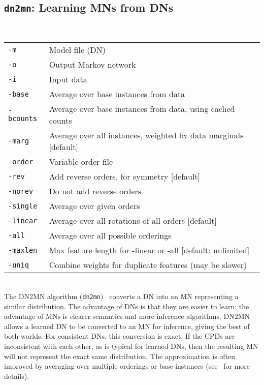 \documentclass[11pt]{article}
\begin{document}
\subsection{{\tt dn2mn}: Learning MNs from DNs} \label{sec:dn2mn}

\noindent {} \\
\begin{tabular}{ll}
{\tt -m} &        Model file (DN) \\
{\tt -o} &        Output Markov network \\
{\tt -i} &        Input data \\
{\tt -base} &     Average over base instances from data \\
{\tt -bcounts} &  Average over base instances from data, using cached counts \\
{\tt -marg} &     Average over all instances, weighted by data marginals [default] \\
{\tt -order} &    Variable order file \\
{\tt -rev} &      Add reverse orders, for symmetry [default] \\
{\tt -norev} &    Do not add reverse orders \\
{\tt -single} &   Average over given orders \\
{\tt -linear} &   Average over all rotations of all orders [default] \\
{\tt -all} &      Average over all possible orderings \\
{\tt -maxlen} &   Max feature length for -linear or -all [default: unlimited] \\
{\tt -uniq} &     Combine weights for duplicate features (may be slower) \\
\end{tabular} \\

The DN2MN algorithm ({\tt dn2mn})~\cite{lowd12} converts a DN into an
MN representing a similar distribution.  The advantage of DNs is that
they are easier to learn; the advantage of MNs is clearer semantics
and more inference algorithms.  DN2MN allows a learned DN to be
converted to an MN for inference, giving the best of both worlds.  For
consistent DNs, this conversion is exact.  If the CPDs are
inconsistent with each other, as is typical for learned DNs, then the
resulting MN will not represent the exact same distribution.  The
approximation is often improved by averaging over multiple orderings
or base instances (see~\cite{lowd12} for more details).
\end{document}
